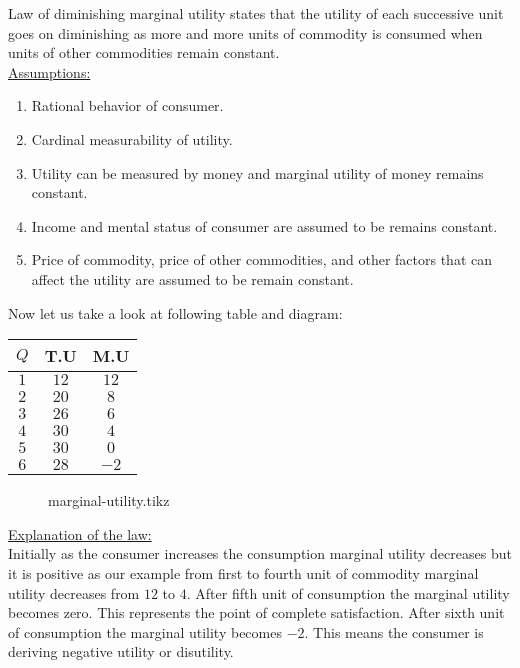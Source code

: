 \documentclass[12pt]{article}
\begin{document}
\begin{soln}
	Law of diminishing marginal utility states that the utility of each successive unit goes on diminishing as more and more units of commodity is consumed when units of other commodities remain constant.\\
	\underline{Assumptions:}
	\begin{enumerate}[label=(\roman*)]
		\item Rational behavior of consumer.
		\item Cardinal measurability of utility.
		\item Utility can be measured by money and marginal utility of money remains constant.
		\item Income and mental status of consumer are assumed to be remains constant.
		\item Price of commodity, price of other commodities, and other factors that can affect the utility are assumed to be remain constant.
	\end{enumerate}
	Now let us take a look at following table and diagram:
	\begin{table}[H]
		\centering
		\begin{tabular}{|c|c|c|}
			\hline
			$ Q $ & T.U    & M.U    \\\hline
			$ 1 $ & $ 12 $ & $ 12 $ \\\hline
			$ 2 $ & $ 20 $ & $ 8 $  \\\hline
			$ 3 $ & $ 26 $ & $ 6 $  \\\hline
			$ 4 $ & $ 30 $ & $ 4 $  \\\hline
			$ 5 $ & $ 30 $ & $ 0 $  \\\hline
			$ 6 $ & $ 28 $ & $ -2 $ \\\hline
		\end{tabular}
	\end{table}
	\begin{figure}[H]
		\centering
		{marginal-utility.tikz}
	\end{figure}
	\underline{Explanation of the law:}\\
	Initially as the consumer increases the consumption marginal utility decreases but it is positive as our example from first to fourth unit of commodity marginal utility decreases from $ 12 $ to $ 4 $. After fifth unit of consumption the marginal utility becomes zero. This represents the point of complete satisfaction. After sixth unit of consumption the marginal utility becomes $ -2 $. This means the consumer is deriving negative utility or disutility.
\end{soln}
\newpage
\end{document}
